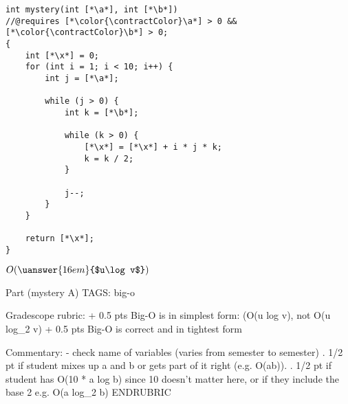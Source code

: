 \bgroup

\renewcommand{\a}
{u} %
\renewcommand{\b}
{v} %
\newcommand{\x}
{y} %

\begin{lstlisting}
int mystery(int [*\a*], int [*\b*])
//@requires [*\color{\contractColor}\a*] > 0 && [*\color{\contractColor}\b*] > 0;
{
    int [*\x*] = 0;
    for (int i = 1; i < 10; i++) {
        int j = [*\a*];

        while (j > 0) {
            int k = [*\b*];

            while (k > 0) {
                [*\x*] = [*\x*] + i * j * k;
                k = k / 2;
            }

            j--;
        }
    }

    return [*\x*];
}
\end{lstlisting}

\begin{framed}\vspace{0.25in}
$O(\uanswer{16em}{$\a \log \b$})$
\end{framed}

\RUBRIC
Part (mystery A)
TAGS: big-o

Gradescope rubric:
+ 0.5 pts Big-O is in simplest form: (O(u log v), not O(u log_2 v)
+ 0.5 pts Big-O is correct and in tightest form

Commentary:
- check name of variables (varies from semester to semester)
. 1/2 pt if student mixes up a and b or gets part of it right
  (e.g. O(ab)).
. 1/2 pt if student has O(10 * a log b) since 10 doesn't matter
  here, or if they include the base 2 e.g. O(a log_2 b)
ENDRUBRIC

\egroup